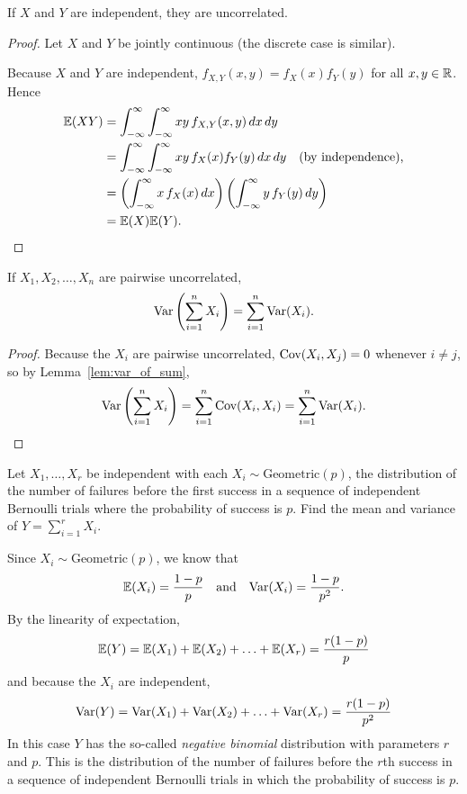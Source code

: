 \begin{lemma}\label{lem:indept_implies_uncorrelated}
If $X$ and $Y$ are independent, they are uncorrelated.
\end{lemma}
\begin{proof}
Let $X$ and $Y$ be jointly continuous (the discrete case is similar).
\par
Because $X$ and $Y$ are independent, $f_{X,Y}(x,y)=f_X(x)f_Y(y)$ for all $x,y\in\mathbb{R}$. Hence
\begin{align*}
\mathbb{E}(XY) 
	& = \int_{-\infty}^{\infty}\int_{-\infty}^{\infty} xy\, f_{X,Y}(x,y)\,dx\,dy \\
	& = \int_{-\infty}^{\infty}\int_{-\infty}^{\infty} xy\, f_X(x)f_Y(y)\,dx\,dy \text{\quad(by independence),}\\
	& = \left(\int_{-\infty}^{\infty}x\,f_X(x)\,dx\right)\left(\int_{-\infty}^{\infty}y\,f_Y(y)\,dy\right) \\
	& = \mathbb{E}(X)\mathbb{E}(Y).
\end{align*}
\end{proof}

\begin{lemma}\label{lem:var_of_indept_sum}
If $X_1,X_2,\ldots,X_n$ are pairwise uncorrelated,
\[
\text{Var}\left(\sum_{i=1}^n X_i\right) = \sum_{i=1}^n\text{Var}(X_i).
\]
\end{lemma}
\begin{proof}
Because the $X_i$ are pairwise uncorrelated, $\text{Cov}(X_i,X_j)=0$ whenever $i\neq j$, so by Lemma~\ref{lem:var_of_sum},
\[
\text{Var}\left(\sum_{i=1}^n X_i\right) = \sum_{i=1}^n\text{Cov}(X_i,X_i) = \sum_{i=1}^n\text{Var}(X_i).
\]
\end{proof}

\begin{example}
Let $X_1,\ldots,X_r$ be independent with each $X_i\sim\text{Geometric}(p)$, the distribution of the number of failures before the first success in a sequence of independent Bernoulli trials where the probability of success is $p$. Find the mean and variance of $Y = \sum_{i=1}^r X_i$.
\begin{solution}
Since $X_i\sim\text{Geometric}(p)$, we know that 
\[
\mathbb{E}(X_i)=\frac{1-p}{p} \quad\text{and}\quad \text{Var}(X_i)=\frac{1-p}{p^2}.
\]
By the linearity of expectation,
\[
\mathbb{E}(Y) = \mathbb{E}(X_1)+\mathbb{E}(X_2)+\ldots+\mathbb{E}(X_r) = \frac{r(1-p)}{p}
\]
and because the $X_i$ are independent,
\[
\text{Var}(Y) = \text{Var}(X_1)+\text{Var}(X_2)+\ldots+\text{Var}(X_r) = \frac{r(1-p)}{p^2}
\]
In this case $Y$ has the so-called \emph{negative binomial} distribution with parameters $r$ and $p$. This is the distribution of the number of failures before the $r$th success in a sequence of independent Bernoulli trials in which the probability of success is $p$.
\end{solution}
\end{example}

